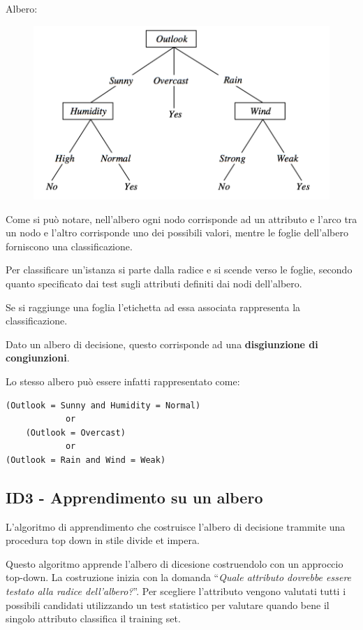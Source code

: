 Albero:

\begin{figure}[htbp]
\centering
\includegraphics{./notes/immagini/l7-albero.png}
\caption{}
\end{figure}

Come si può notare, nell'albero ogni nodo corrisponde ad un attributo e
l'arco tra un nodo e l'altro corrisponde uno dei possibili valori,
mentre le foglie dell'albero forniscono una classificazione.

Per classificare un'istanza si parte dalla radice e si scende verso le
foglie, secondo quanto specificato dai test sugli attributi definiti dai
nodi dell'albero.

Se si raggiunge una foglia l'etichetta ad essa associata rappresenta la
classificazione.

Dato un albero di decisione, questo corrisponde ad una
\textbf{disgiunzione di congiunzioni}.

Lo stesso albero può essere infatti rappresentato come:

\begin{verbatim}
(Outlook = Sunny and Humidity = Normal) 
            or 
    (Outlook = Overcast)
            or
(Outlook = Rain and Wind = Weak) 
\end{verbatim}

\subsection{ID3 - Apprendimento su un
albero}\label{id3---apprendimento-su-un-albero}

L'algoritmo di apprendimento che costruisce l'albero di decisione
trammite una procedura top down in stile divide et impera.

Questo algoritmo apprende l'albero di dicesione costruendolo con un
approccio top-down. La costruzione inizia con la domanda ``\emph{Quale
attributo dovrebbe essere testato alla radice dell'albero?}''. Per
scegliere l'attributo vengono valutati tutti i possibili candidati
utilizzando un test statistico per valutare quando bene il singolo
attributo classifica il training set.

